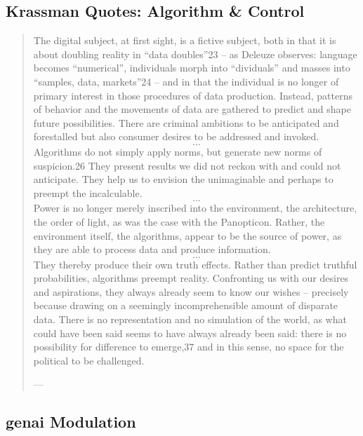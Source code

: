\subsection{Krassman Quotes: Algorithm \& Control}
\begin{quote}
	The digital subject, at first sight, is a fictive subject, both in that it is about doubling reality in “data doubles”23 – as Deleuze observes: language becomes “numerical”, individuals morph into “dividuals” and masses into “samples, data, markets”24 – and in that the individual is no longer of primary interest in those procedures of data production. Instead, patterns of behavior and the movements of data are gathered to predict and shape future possibilities. There are criminal ambitions to be anticipated and forestalled but also consumer desires to be addressed and invoked. \[...\] Algorithms do not simply apply norms, but generate new norms of suspicion.26 They present results we did not reckon with and could not anticipate. They help us to envision the unimaginable and perhaps to preempt the incalculable. \[...\] Power is no longer merely inscribed into the environment, the architecture, the order of light, as was the case with the Panopticon. Rather, the environment itself, the algorithms, appear to be the source of power, as they are able to process data and produce information. \[...\] They thereby produce their own truth effects. Rather than predict truthful probabilities, algorithms preempt reality. Confronting us with our desires and aspirations, they always already seem to know our wishes – precisely because drawing on a seemingly incomprehensible amount of disparate data. There is no representation and no simulation of the world, as what could have been said seems to have always already been said: there is no possibility for difference to emerge,37 and in this sense, no space for the political to be challenged.

	— \cite[15-16]{Krasmann2017}
\end{quote}



\subsection{\Gls{genai} Modulation }



